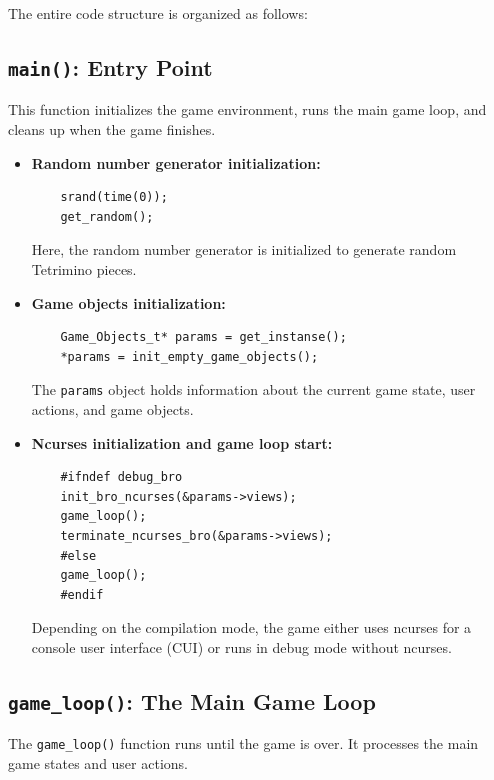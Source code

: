 \documentclass{article}
\begin{document}
The entire code structure is organized as follows:

\subsection{\texttt{main()}: Entry Point}

This function initializes the game environment, runs the main game loop, and cleans up when the game finishes.

\begin{itemize}
    \item \textbf{Random number generator initialization:}
    \begin{verbatim}
    srand(time(0));
    get_random();
    \end{verbatim}
    Here, the random number generator is initialized to generate random Tetrimino pieces.
    
    \item \textbf{Game objects initialization:}
    \begin{verbatim}
    Game_Objects_t* params = get_instanse();
    *params = init_empty_game_objects();
    \end{verbatim}
    The \texttt{params} object holds information about the current game state, user actions, and game objects.

    \item \textbf{Ncurses initialization and game loop start:}
    \begin{verbatim}
    #ifndef debug_bro
    init_bro_ncurses(&params->views);
    game_loop();
    terminate_ncurses_bro(&params->views);
    #else
    game_loop();
    #endif
    \end{verbatim}
    Depending on the compilation mode, the game either uses ncurses for a console user interface (CUI) or runs in debug mode without ncurses.
\end{itemize}

\subsection{\texttt{game\_loop()}: The Main Game Loop}

The \texttt{game\_loop()} function runs until the game is over. It processes the main game states and user actions.
\end{document}
